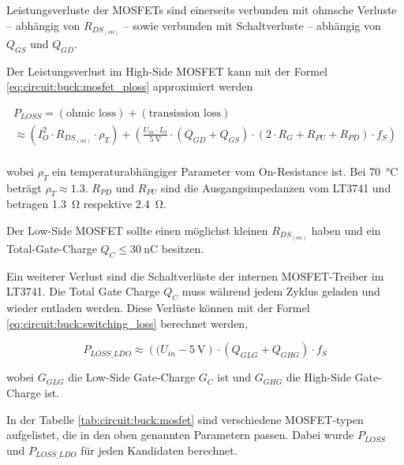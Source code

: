 Leistungsverluste der MOSFETs sind einerseits verbunden mit ohmsche  Verluste --
abh\"angig  von  $R_{DS_{(on)}}$  --  sowie   verbunden  mit  Schaltverluste  --
abh\"angig von $Q_{GS}$ und $Q_{GD}$.

Der    Leistungsverlust    im    High-Side   MOSFET   kann   mit   der    Formel
\ref{eq:circuit:buck:mosfet_ploss} approximiert werden

\begin{multline}
    P_{LOSS} = (\textrm{ohmic loss}) + (\textrm{transission loss}) \\
             \approx \left( I_O^2 \cdot R_{DS_{(on)}} \cdot \rho_T \right)
                    + \left( \frac{U_{in} \cdot I_O}{\SI{5}{\volt}} \cdot \left(Q_{GD} + Q_{GS} \right) \cdot \left( 2 \cdot R_G + R_{PU} + R_{PD} \right) \cdot f_S \right) \\
    \label{eq:circuit:buck:mosfet_ploss}
\end{multline}

wobei $\rho_T$ ein temperaturabh\"angiger  Parameter  vom On-Resistance ist. Bei
\SI{70}{\celsius} betr\"agt $\rho_T \approx 1.3$. $R_{PD}$ und $R_{PU}$ sind die
Ausgangsimpedanzen   vom   LT3741   und   betragen   \SI{1.3}{\ohm}   respektive
\SI{2.4}{\ohm}.

Der  Low-Side MOSFET sollte einen m\"oglichst kleinen $R_{DS_{(on)}}$ haben  und
ein    Total-Gate-Charge    $Q_C    \leq    \SI{30}{\nano\coulomb}$    besitzen.

Ein  weiterer Verlust sind die Schaltverl\"uste der internen  MOSFET-Treiber  im
LT3741. Die Total Gate Charge $Q_C$ muss  w\"ahrend  jedem  Zyklus  geladen  und
wieder   entladen   werden.   Diese   Verl\"uste   k\"onnen   mit   der   Formel
\ref{eq:circuit:buck:switching_loss} berechnet werden,

\begin{equation}
    P_{LOSS\_LDO} \approx \left( (U_{in} - \SI{5}{\volt} \right) \cdot \left( Q_{GLG} + Q_{GHG} \right) \cdot f_S
    \label{eq:circuit:buck:switching_loss}
\end{equation}

wobei $G_{GLG}$ die  Low-Side  Gate-Charge $G_C$ ist und $G_{GHG}$ die High-Side
Gate-Charge ist.

In  der  Tabelle  \ref{tab:circuit:buck:mosfet}  sind  verschiedene MOSFET-typen
aufgelistet, die in den oben genannten Parametern passen. Dabei wurde $P_{LOSS}$
und $P_{LOSS\_LDO}$ f\"ur jeden Kandidaten berechnet.

